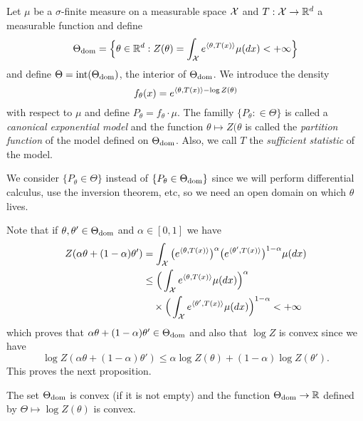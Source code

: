 \begin{definition}
	Let $\mu$ be a $\sigma$-finite measure on a measurable space $\operatorname{{\mathcal X}}$ and $T : \operatorname{{\mathcal X}} \rightarrow \mathbb R^d$ a measurable function and define
	\begin{equation*}
		\Theta_{\operatorname{dom}} = \Big \{ \theta \in \mathbb R^d : Z(\theta) = \int_{\operatorname{{\mathcal X}}} e^{\langle \theta, T(x) \rangle} \mu(dx) < +\infty \Big\}
	\end{equation*}
	and define $\Theta = \operatorname{int}(\Theta_{\operatorname{dom}})$, the interior of $\Theta_{\operatorname{dom}}$.
	We introduce the density
	\begin{equation*}
		f_\theta(x) = e^{ \langle \theta, T(x) \rangle - \log Z(\theta)}
	\end{equation*}
	with respect to $\mu$ and define $P_\theta = f_\theta \cdot \mu$. The familly $\{ P_\theta : \in \Theta \}$ is called a \emph{canonical exponential model} and the function $\theta \mapsto Z(\theta$ is called the \emph{partition function} of the model defined on $\Theta_{\operatorname{dom}}$. Also, we call $T$ the \emph{sufficient statistic} of the model.
\end{definition}

We consider $\{ P_\theta \in \Theta \}$ instead of $\{ P_\theta \in \Theta_{\operatorname{dom}} \}$ since we will perform differential calculus, use the inversion theorem, etc, so we need an open domain on which $\theta$ lives.


Note that if $\theta, \theta' \in \Theta_{\operatorname{dom}}$ and $\alpha \in [0, 1]$ we have
\begin{align*}
	Z(\alpha \theta + (1 - \alpha) \theta') &= \int_{\operatorname{{\mathcal X}}} 
	\big( e^{\langle \theta, T(x) \rangle} \big)^\alpha 
	\big( e^{\langle \theta', T(x) \rangle} \big)^{1 - \alpha} \mu(dx) \\
	&\leq \Big( \int_{\operatorname{{\mathcal X}}} e^{\langle \theta, T(x) \rangle} \mu(dx) \Big)^{\alpha} \\
	& \quad \times \Big(\int_{\operatorname{{\mathcal X}}} e^{\langle \theta', T(x) \rangle} \mu(dx) \Big)^{1 - \alpha} < +\infty
\end{align*}
which proves that $\alpha \theta + (1 - \alpha) \theta' \in \Theta_{\operatorname{dom}}$ and also that $\log Z$ is convex since we have
\begin{equation*}
	\log Z(\alpha \theta + (1 - \alpha) \theta') \leq \alpha \log Z(\theta) + (1 - \alpha) \log Z(\theta').
\end{equation*}
This proves the next proposition.
\begin{proposition}
		The set $\Theta_{\operatorname{dom}}$ is convex (if it is not empty) and the function $\Theta_{\operatorname{dom}} \rightarrow \mathbb R$ defined by $\Theta \mapsto \log Z(\theta)$ is convex.
\end{proposition}

